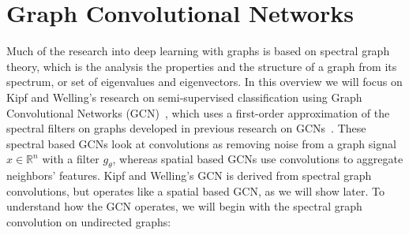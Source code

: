 
\section{Graph Convolutional Networks}
Much of the research into deep learning with graphs is based on spectral graph theory, which is the analysis the properties and the structure of a graph from its spectrum, or set of eigenvalues and eigenvectors. In this overview we will focus on Kipf and Welling's research on semi-supervised classification using Graph Convolutional Networks (GCN)~\cite{Kipf2016}, which uses a first-order approximation of the spectral filters on graphs developed in previous research on GCNs~\cite{Bruna2013}. These spectral based GCNs look at convolutions as removing noise from a graph signal $x \in \mathbb{R}^n$ with a filter $g_\theta$, whereas spatial based GCNs use convolutions to aggregate neighbors' features. Kipf and Welling's GCN is derived from spectral graph convolutions, but operates like a spatial based GCN, as we will show later. To understand how the GCN operates, we will begin with the spectral graph convolution on undirected graphs:

